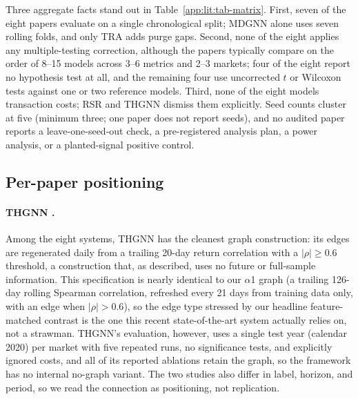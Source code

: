 \documentclass{article}
\begin{document}
Three aggregate facts stand out in Table~\ref{app:lit:tab-matrix}. First, seven of the eight papers evaluate on a single chronological split; MDGNN alone uses seven rolling folds, and only TRA adds purge gaps. Second, none of the eight applies any multiple-testing correction, although the papers typically compare on the order of 8--15 models across 3--6 metrics and 2--3 markets; four of the eight report no hypothesis test at all, and the remaining four use uncorrected $t$ or Wilcoxon tests against one or two reference models. Third, none of the eight models transaction costs; RSR and THGNN dismiss them explicitly. Seed counts cluster at five (minimum three; one paper does not report seeds), and no audited paper reports a leave-one-seed-out check, a pre-registered analysis plan, a power analysis, or a planted-signal positive control.

\subsection{Per-paper positioning}\label{app:lit:papers}

\paragraph{THGNN \citep{thgnn2022}.} Among the eight systems, THGNN has the cleanest graph construction: its edges are regenerated daily from a trailing 20-day return correlation with a $|\rho|\ge 0.6$ threshold, a construction that, as described, uses no future or full-sample information. This specification is nearly identical to our $\alpha$1 graph (a trailing 126-day rolling Spearman correlation, refreshed every 21 days from training data only, with an edge when $|\rho|>0.6$), so the edge type stressed by our headline feature-matched contrast is the one this recent state-of-the-art system actually relies on, not a strawman. THGNN's evaluation, however, uses a single test year (calendar 2020) per market with five repeated runs, no significance tests, and explicitly ignored costs, and all of its reported ablations retain the graph, so the framework has no internal no-graph variant. The two studies also differ in label, horizon, and period, so we read the connection as positioning, not replication.
\end{document}

